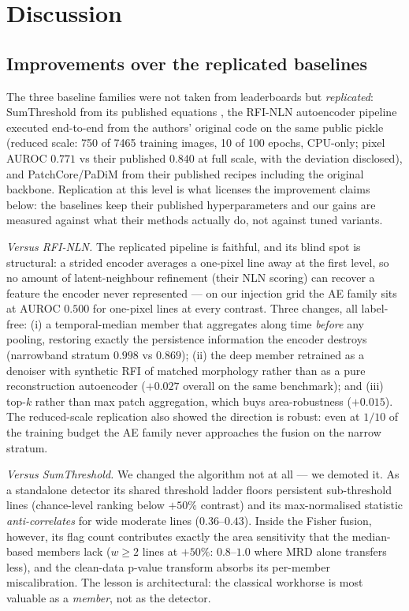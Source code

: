 \documentclass[journal]{IEEEtran}
\begin{document}
\section{Discussion}
\subsection{Improvements over the replicated baselines}
\label{sec:improve}
The three baseline families were not taken from leaderboards but
\emph{replicated}: SumThreshold from its published equations
\cite{offringa2010}, the RFI-NLN autoencoder pipeline executed end-to-end
from the authors' original code on the same public pickle (reduced scale:
750 of 7465 training images, 10 of 100 epochs, CPU-only; pixel AUROC
$0.771$ vs their published $0.840$ at full scale, with the deviation
disclosed), and PatchCore/PaDiM from their published recipes including the
original backbone.  Replication at this level is what licenses the
improvement claims below: the baselines keep their published
hyperparameters and our gains are measured against what their methods
actually do, not against tuned variants.

\emph{Versus RFI-NLN.}  The replicated pipeline is faithful, and its
blind spot is structural: a strided encoder averages a one-pixel line away
at the first level, so no amount of latent-neighbour refinement (their NLN
scoring) can recover a feature the encoder never represented --- on our
injection grid the AE family sits at AUROC $0.500$ for one-pixel lines at
every contrast.  Three changes, all label-free: (i) a temporal-median
member that aggregates along time \emph{before} any pooling, restoring
exactly the persistence information the encoder destroys (narrowband
stratum $0.998$ vs $0.869$); (ii) the deep member retrained as a denoiser
with synthetic RFI of matched morphology rather than as a pure
reconstruction autoencoder ($+0.027$ overall on the same benchmark); and
(iii) top-$k$ rather than max patch aggregation, which buys area-robustness
($+0.015$).  The reduced-scale replication also showed the direction is
robust: even at $1/10$ of the training budget the AE family never
approaches the fusion on the narrow stratum.

\emph{Versus SumThreshold.}  We changed the algorithm not at all --- we
demoted it.  As a standalone detector its shared threshold ladder floors
persistent sub-threshold lines (chance-level ranking below $+50\%$
contrast) and its max-normalised statistic \emph{anti-correlates} for wide
moderate lines ($0.36$--$0.43$).  Inside the Fisher fusion, however, its
flag count contributes exactly the area sensitivity that the median-based
members lack ($w\ge2$ lines at $+50\%$: $0.8$--$1.0$ where MRD alone
transfers less), and the clean-data p-value transform absorbs its
per-member miscalibration.  The lesson is architectural: the classical
workhorse is most valuable as a \emph{member}, not as the detector.
\end{document}
